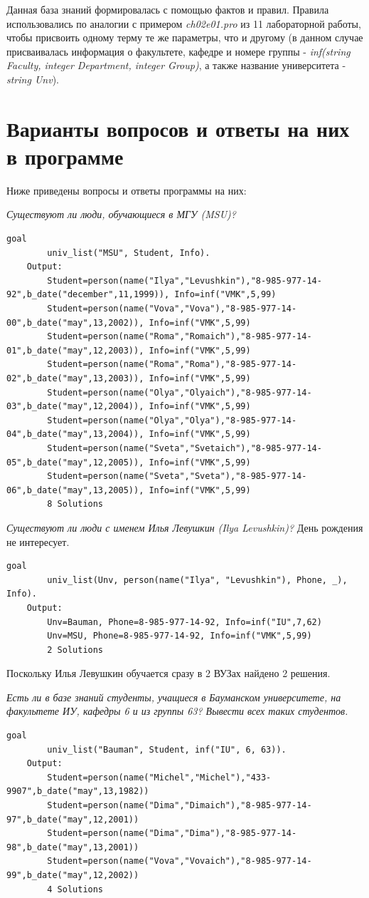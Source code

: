 \documentclass[a4paper,12pt]{article}
\begin{document}
	Данная база знаний формировалась с помощью фактов и правил. Правила использовались по аналогии с примером \textit{ch02e01.pro} из 11 лабораторной работы, чтобы присвоить одному терму те же параметры, что и другому (в данном случае присваивалась информация о факультете, кафедре и номере группы - \textit{inf(string Faculty, integer Department, integer Group)}, а также название университета - \textit{string Unv}).
	
	\section{Варианты вопросов и ответы на них в программе}
	
	Ниже приведены вопросы и ответы программы на них:
	
	\textit{Существуют ли люди, обучающиеся в МГУ (MSU)?}
	\begin{lstlisting}[label = lst_qw_1, caption = Пример 1]
	goal
		univ_list("MSU", Student, Info).
	Output:
		Student=person(name("Ilya","Levushkin"),"8-985-977-14-92",b_date("december",11,1999)), Info=inf("VMK",5,99)
		Student=person(name("Vova","Vova"),"8-985-977-14-00",b_date("may",13,2002)), Info=inf("VMK",5,99)
		Student=person(name("Roma","Romaich"),"8-985-977-14-01",b_date("may",12,2003)), Info=inf("VMK",5,99)
		Student=person(name("Roma","Roma"),"8-985-977-14-02",b_date("may",13,2003)), Info=inf("VMK",5,99)
		Student=person(name("Olya","Olyaich"),"8-985-977-14-03",b_date("may",12,2004)), Info=inf("VMK",5,99)
		Student=person(name("Olya","Olya"),"8-985-977-14-04",b_date("may",13,2004)), Info=inf("VMK",5,99)
		Student=person(name("Sveta","Svetaich"),"8-985-977-14-05",b_date("may",12,2005)), Info=inf("VMK",5,99)
		Student=person(name("Sveta","Sveta"),"8-985-977-14-06",b_date("may",13,2005)), Info=inf("VMK",5,99)
		8 Solutions
	\end{lstlisting}
	
	
	\textit{Существуют ли люди с именем Илья Левушкин (Ilya Levushkin)?}
	День рождения не интересует.
	\begin{lstlisting}[label = lst_qw_2, caption = Пример 2]
	goal
		univ_list(Unv, person(name("Ilya", "Levushkin"), Phone, _), Info).
	Output:
		Unv=Bauman, Phone=8-985-977-14-92, Info=inf("IU",7,62)
		Unv=MSU, Phone=8-985-977-14-92, Info=inf("VMK",5,99)
		2 Solutions
	\end{lstlisting}
	
	Поскольку Илья Левушкин обучается сразу в 2 ВУЗах найдено 2 решения.
	
	
	\textit{Есть ли в базе знаний студенты, учащиеся в Бауманском университете, на факультете ИУ, кафедры 6 и из группы 63? Вывести всех таких студентов.}
	\begin{lstlisting}[label = lst_qw_3, caption = Пример 3]
	goal
		univ_list("Bauman", Student, inf("IU", 6, 63)).
	Output:
		Student=person(name("Michel","Michel"),"433-9907",b_date("may",13,1982))
		Student=person(name("Dima","Dimaich"),"8-985-977-14-97",b_date("may",12,2001))
		Student=person(name("Dima","Dima"),"8-985-977-14-98",b_date("may",13,2001))
		Student=person(name("Vova","Vovaich"),"8-985-977-14-99",b_date("may",12,2002))
		4 Solutions
	\end{lstlisting}
	
\end{document}
